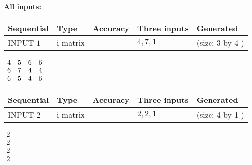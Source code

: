 \documentclass[12pt]{article}
\begin{document}
   
\noindent\vspace{0.1in}\hspace{-0.08in} {\textbf{\Large{All inputs: }}}
   
   
  
  
\noindent\begin{tabular}{|l|l|l|l|l|}
\hline
 Sequential & Type & Accuracy & Three inputs & Generated \\ 
\hline
 
 
  INPUT $            1 $ & i-matrix &  & $
 4
 , 
 7
 , 
 1
 $ & (size:            3  by            4 )
 \\  \hline  
 \end{tabular}
   
   
 $\begin{array}{
 c
 c
 c
 c
 }
           4  & 
           5  & 
           6  & 
           6  \\ 
           6  & 
           7  & 
           4  & 
           4  \\ 
           6  & 
           5  & 
           4  & 
           6
\end{array}  $ 
  
  
\noindent\begin{tabular}{|l|l|l|l|l|}
\hline
 Sequential & Type & Accuracy & Three inputs & Generated \\ 
\hline
 
 
  INPUT $            2 $ & i-matrix &  & $
 2
 , 
 2
 , 
 1
 $ & (size:            4  by            1 )
 \\  \hline  
 \end{tabular}
   
   
 $\begin{array}{
 c
 }
           2  \\ 
           2  \\ 
           2  \\ 
           2
\end{array}  $ 
  
\end{document}
